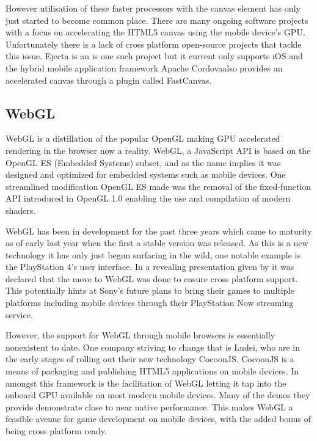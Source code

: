 \documentclass[final]{cmpreport}
\begin{document}
However utilisation of these faster processors with the canvas element has only just started to become common place. There are many ongoing software projects with a focus on accelerating the HTML5 canvas using the mobile device's GPU. Unfortunately there is a lack of cross platform open-source projects that tackle this issue. Ejecta is an is one such project but it current only supports iOS and the hybrid mobile application framework Apache Cordova\footnotemark also provides an accelerated canvas through a plugin called FastCanvas\footnotemark.


\subsection{WebGL}
WebGL is a distillation of the popular OpenGL making GPU accelerated rendering in the browser now a reality. WebGL, a JavaScript API is based on the OpenGL ES (Embedded Systems) subset, and as the name implies it was designed and optimized for embedded systems such as mobile devices. One streamlined modification OpenGL ES made was the removal of the fixed-function API introduced in OpenGL 1.0 enabling the use and compilation of modern shaders.

WebGL has been in development for the past three years which came to maturity as of early last year when the first a stable version was released. As this is a new technology it has only just begun surfacing in the wild, one notable example is the PlayStation 4's user interface. In a revealing presentation given by \cite{Olmstead} it was declared that the move to WebGL was done to ensure cross platform support. This potentially hints at Sony's future plans to bring their games to multiple platforms including mobile devices through their PlayStation Now streaming service.

However, the support for WebGL through mobile browsers is essentially nonexistent to date. One company striving to change that is Ludei, who are in the early stages of rolling out their new technology CocoonJS. CocoonJS is a means of packaging and publishing HTML5 applications on mobile devices. In amongst this framework is the facilitation of WebGL letting it tap into the onboard GPU available on most modern mobile devices. Many of the demos they provide demonstrate close to near native performance. This makes WebGL a feasible avenue for game development on mobile devices, with the added bonus of being cross platform ready.
\end{document}
